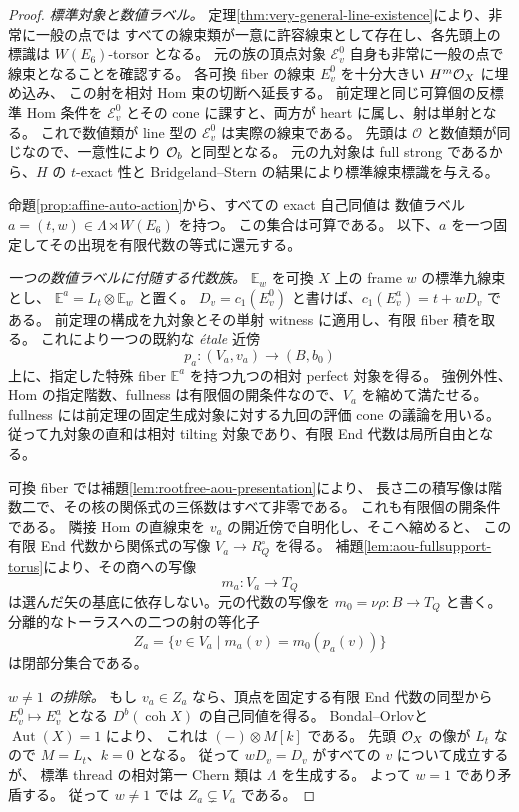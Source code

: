 \begin{proof}
\emph{標準対象と数値ラベル。}
定理\ref{thm:very-general-line-existence}により、非常に一般の点では
すべての線束類が一意に許容線束として存在し、各先頭上の標識は $W(E_6)$-torsor となる。
元の族の頂点対象 $\mathscr E_v^0$ 自身も非常に一般の点で線束となることを確認する。
各可換 fiber の線束 $E_v^0$ を十分大きい $H^m\mathcal O_X$ に埋め込み、
この射を相対 Hom 束の切断へ延長する。
前定理と同じ可算個の反標準 Hom 条件を
$\mathscr E_v^0$ とその cone に課すと、両方が heart に属し、射は単射となる。
これで数値類が line 型の $\mathscr E_v^0$ は実際の線束である。
先頭は $\mathscr O$ と数値類が同じなので、一意性により $\mathcal O_b$ と同型となる。
元の九対象は full strong であるから、$H$ の $t$-exact 性と
Bridgeland--Stern の結果により標準線束標識を与える。

命題\ref{prop:affine-auto-action}から、すべての exact 自己同値は
数値ラベル $a=(t,w)\in\Lambda\rtimes W(E_6)$ を持つ。
この集合は可算である。
以下、$a$ を一つ固定してその出現を有限代数の等式に還元する。

\emph{一つの数値ラベルに付随する代数族。}
$\mathbb E_w$ を可換 $X$ 上の frame $w$ の標準九線束とし、
$\mathbb E^a=L_t\otimes\mathbb E_w$ と置く。
$D_v=c_1(E_v^0)$ と書けば、$c_1(E_v^a)=t+wD_v$ である。
前定理の構成を九対象とその単射 witness に適用し、有限 fiber 積を取る。
これにより一つの既約な \textit{\'etale} 近傍
\[
 p_a:(V_a,v_a)\longrightarrow(B,b_0)
\]
上に、指定した特殊 fiber $\mathbb E^a$ を持つ九つの相対 perfect 対象を得る。
強例外性、Hom の指定階数、fullness は有限個の開条件なので、$V_a$ を縮めて満たせる。
fullness には前定理の固定生成対象に対する九回の評価 cone の議論を用いる。
従って九対象の直和は相対 tilting 対象であり、有限 End 代数は局所自由となる。

可換 fiber では補題\ref{lem:rootfree-aou-presentation}により、
長さ二の積写像は階数二で、その核の関係式の三係数はすべて非零である。
これも有限個の開条件である。
隣接 Hom の直線束を $v_a$ の開近傍で自明化し、そこへ縮めると、
この有限 End 代数から関係式の写像 $V_a\to R_Q^\circ$ を得る。
補題\ref{lem:aou-fullsupport-torus}により、その商への写像
\[
 m_a:V_a\longrightarrow T_Q
\]
は選んだ矢の基底に依存しない。元の代数の写像を $m_0=\nu\rho:B\to T_Q$ と書く。
分離的なトーラスへの二つの射の等化子
\begin{equation}\label{eq:generic-algebra-equalizer}
 Z_a=\{v\in V_a\mid m_a(v)=m_0(p_a(v))\}
\end{equation}
は閉部分集合である。

\emph{$w\ne1$ の排除。}
もし $v_a\in Z_a$ なら、頂点を固定する有限 End 代数の同型から
$E_v^0\mapsto E_v^a$ となる $D^b(\operatorname{coh}X)$ の自己同値を得る。
Bondal--Orlov\cite[Theorem 3.1]{BO}と $\operatorname{Aut}(X)=1$ により、
これは $(-)\otimes M[k]$ である。
先頭 $\mathcal O_X$ の像が $L_t$ なので $M=L_t$、$k=0$ となる。
従って $wD_v=D_v$ がすべての $v$ について成立するが、
標準 thread の相対第一 Chern 類は $\Lambda$ を生成する。
よって $w=1$ であり矛盾する。
従って $w\ne1$ では $Z_a\subsetneq V_a$ である。


\end{proof}
